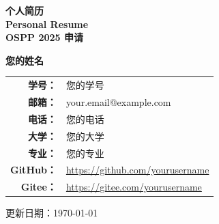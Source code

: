 \documentclass[a4paper,12pt]{article}
\makeatletter
\newcommand{\studentname}{您的姓名}
\newcommand{\studentid}{您的学号}
\newcommand{\studentemail}{your.email@example.com}
\newcommand{\studentphone}{您的电话}
\newcommand{\studentuniversity}{您的大学}
\newcommand{\studentmajor}{您的专业}
\makeatother
\begin{document}
\begin{titlepage}
    \centering
    
    \vspace{0.5cm}
    
    
    {\Huge \textcolor{osppblue}{\textbf{个人简历}}} \\
    \vspace{0.3cm}
    {\LARGE \textcolor{osppblue}{\textbf{Personal Resume}}} \\
    \vspace{0.2cm}
    {\Large \textcolor{osppgray}{\textbf{OSPP 2025 申请}}} \\
    
    \vspace{2cm}
    
    {\huge \textcolor{osppdark}{\textbf{\studentname}}}
    
    \vspace{1cm}
    
    \begin{tabular}{rl}
        \textbf{\textcolor{osppblue}{学号：}} & \studentid \\[0.2cm]
        \textbf{邮箱：} & \studentemail \\[0.1cm]
        \textbf{电话：} & \studentphone \\[0.1cm]
        \textbf{大学：} & \studentuniversity \\[0.1cm]
        \textbf{专业：} & \studentmajor \\[0.2cm]
        \textbf{GitHub：} & \url{https://github.com/yourusername} \\[0.1cm]
        \textbf{Gitee：} & \url{https://gitee.com/yourusername} \\
    \end{tabular}
    
    \vfill
    
    {\large \textcolor{osppgray}{更新日期：\today}}
    
\end{titlepage}
\end{document}
